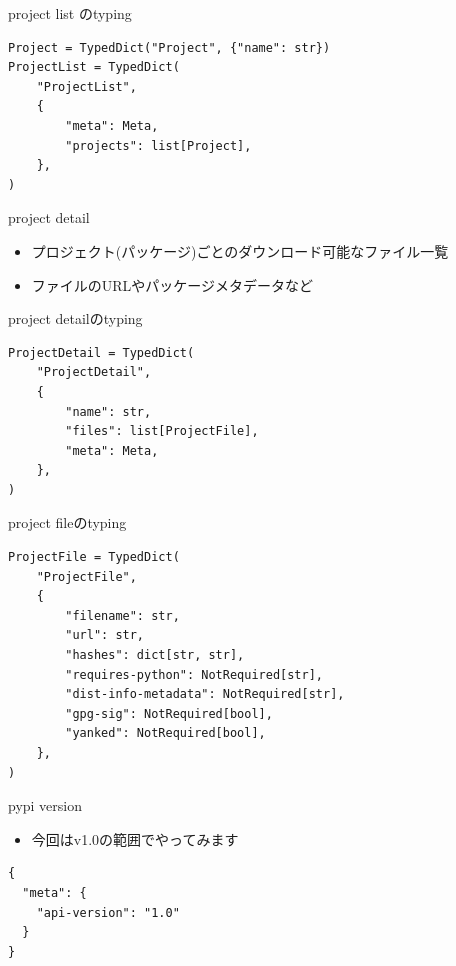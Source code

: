 \documentclass[presentation]{beamer}
\begin{document}
\begin{frame}[label={sec:org1886530},fragile]{project list のtyping}
 \begin{verbatim}
Project = TypedDict("Project", {"name": str})
ProjectList = TypedDict(
    "ProjectList",
    {
        "meta": Meta,
        "projects": list[Project],
    },
)

\end{verbatim}
\end{frame}

\begin{frame}[label={sec:orga419fcd}]{project detail}
\begin{itemize}
\item プロジェクト(パッケージ)ごとのダウンロード可能なファイル一覧
\item ファイルのURLやパッケージメタデータなど
\end{itemize}
\end{frame}

\begin{frame}[label={sec:org67f5231},fragile]{project detailのtyping}
 \begin{verbatim}
ProjectDetail = TypedDict(
    "ProjectDetail",
    {
        "name": str,
        "files": list[ProjectFile],
        "meta": Meta,
    },
)

\end{verbatim}
\end{frame}

\begin{frame}[label={sec:org2af2007},fragile]{project fileのtyping}
 \begin{verbatim}
ProjectFile = TypedDict(
    "ProjectFile",
    {
        "filename": str,
        "url": str,
        "hashes": dict[str, str],
        "requires-python": NotRequired[str],
        "dist-info-metadata": NotRequired[str],
        "gpg-sig": NotRequired[bool],
        "yanked": NotRequired[bool],
    },
)

\end{verbatim}
\end{frame}


\begin{frame}[label={sec:org28d6772},fragile]{pypi version}
 \begin{itemize}
\item 今回はv1.0の範囲でやってみます
\end{itemize}

\begin{verbatim}
{
  "meta": {
    "api-version": "1.0"
  }
}
\end{verbatim}
\end{frame}
\end{document}
